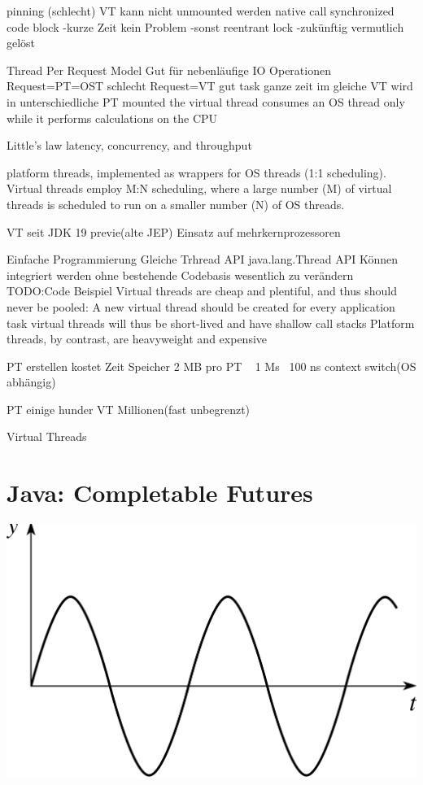 \documentclass[fontsize=12pt,paper=a4,twoside=semi,parskip=half-,headsepline,headinclude]{scrreprt}
\begin{document}
pinning (schlecht)
VT kann nicht unmounted werden
native call
synchronized code block
-kurze Zeit kein Problem
-sonst reentrant lock
-zukünftig vermutlich gelöst

Thread Per Request Model
Gut für nebenläufige IO Operationen
Request=PT=OST schlecht
Request=VT gut
task ganze zeit im gleiche VT
wird in unterschiedliche PT mounted
the virtual thread consumes an OS thread only while it performs calculations on the CPU

Little's law
latency, concurrency, and throughput

platform threads, implemented as wrappers for OS threads (1:1 scheduling). Virtual threads employ M:N scheduling, where a large number (M) of virtual threads is scheduled to run on a smaller number (N) of OS threads.

VT seit JDK 19 previe(alte JEP)
Einsatz auf mehrkernprozessoren

Einfache Programmierung
Gleiche Trhread API
java.lang.Thread API
Können integriert werden ohne bestehende Codebasis wesentlich zu verändern
TODO:Code Beispiel
Virtual threads are cheap and plentiful, and thus should never be pooled: 
A new virtual thread should be created for every application task
virtual threads will thus be short-lived and have shallow call stacks
Platform threads, by contrast, are heavyweight and expensive


PT erstellen kostet Zeit Speicher
2 MB pro PT
~ 1 Ms
~100 ns context switch(OS abhängig)

PT
einige hunder
VT
Millionen(fast unbegrenzt)

Virtual Threads \cite{Karsten2020}

\section{Java: Completable Futures}

\includegraphics[scale=2.5]{figures/example.png}
\end{document}
